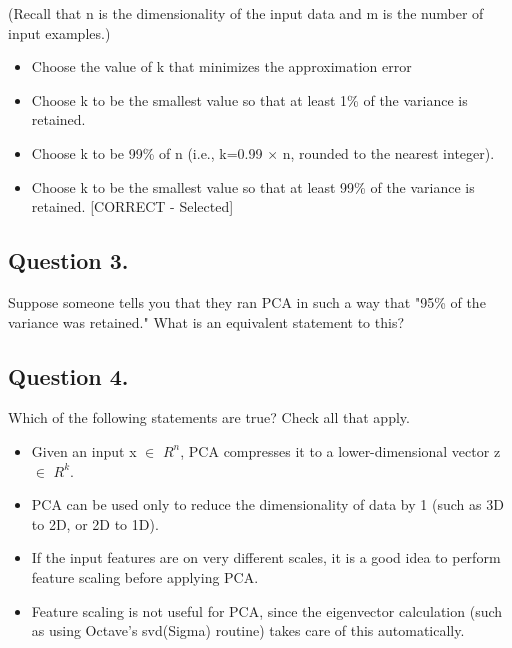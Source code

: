 \documentclass[11pt]{article} %
\begin{document}
(Recall that n is the dimensionality of the input data and m is the number of input examples.)

\begin{itemize}
	\item Choose the value of k that minimizes the approximation error %
	
	\item Choose k to be the smallest value so that at least 1\% of the variance is retained.
	
	\item Choose k to be 99\% of n (i.e., k=0.99 $\times$ n, rounded to the nearest integer).
	
	\item Choose k to be the smallest value so that at least 99\% of the variance is retained. [CORRECT - Selected]
	
\end{itemize}
\subsection{ Question 3. }
Suppose someone tells you that they ran PCA in such a way that "95\% of the variance was retained." What is an equivalent statement to this?

%
%
%

\subsection{ Question 4. }
Which of the following statements are true? Check all that apply.

\begin{itemize}
	\item Given an input x $\in$ $R^n$, PCA compresses it to a lower-dimensional vector z$\in$ $R^k$.
	
	\item PCA can be used only to reduce the dimensionality of data by 1 (such as 3D to 2D, or 2D to 1D).
	
	\item If the input features are on very different scales, it is a good idea to perform feature scaling before applying PCA.
	
	\item Feature scaling is not useful for PCA, since the eigenvector calculation (such as using Octave's svd(Sigma) routine) takes care of this automatically.
\end{itemize}
\end{document}

